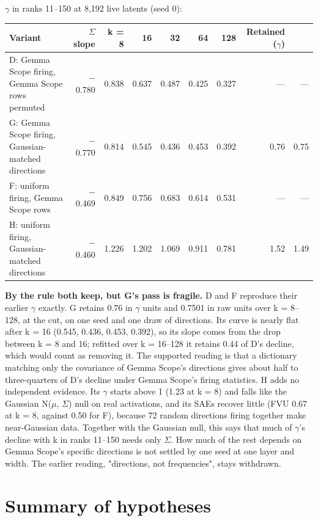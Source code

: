 \documentclass[11pt]{article}
\begin{document}
$\gamma$ in ranks 11--150 at 8,192 live latents (seed 0):

{\footnotesize\setlength{\tabcolsep}{4pt}
\begin{xltabular}{\textwidth}{>{\raggedright\arraybackslash}Xrrrrrrrr}
\toprule
\textbf{Variant} & \textbf{$\Sigma$ slope} & \textbf{k = 8} & \textbf{16} & \textbf{32} & \textbf{64} & \textbf{128} & \textbf{Retained ($\gamma$)} & \textbf{} \\
\midrule
\endhead
\bottomrule
\endlastfoot
D: Gemma Scope firing, Gemma Scope rows permuted & $-$0.780 & 0.838 & 0.637 & 0.487 & 0.425 & 0.327 & --- & --- \\
G: Gemma Scope firing, Gaussian-matched directions & $-$0.770 & 0.814 & 0.545 & 0.436 & 0.453 & 0.392 & 0.76 & 0.75 \\
F: uniform firing, Gemma Scope rows & $-$0.469 & 0.849 & 0.756 & 0.683 & 0.614 & 0.531 & --- & --- \\
H: uniform firing, Gaussian-matched directions & $-$0.460 & 1.226 & 1.202 & 1.069 & 0.911 & 0.781 & 1.52 & 1.49 \\
\end{xltabular}}

\textbf{By the rule both keep, but G's pass is fragile.} D and F reproduce their earlier $\gamma$ exactly. G retains 0.76 in $\gamma$ units and 0.7501 in raw units over k = 8--128, at the cut, on one seed and one draw of directions. Its curve is nearly flat after k = 16 (0.545, 0.436, 0.453, 0.392), so its slope comes from the drop between k = 8 and 16; refitted over k = 16--128 it retains 0.44 of D's decline, which would count as removing it. The supported reading is that a dictionary matching only the covariance of Gemma Scope's directions gives about half to three-quarters of D's decline under Gemma Scope's firing statistics. H adds no independent evidence. Its $\gamma$ starts above 1 (1.23 at k = 8) and falls like the Gaussian N($\mu$, $\Sigma$) null on real activations, and its SAEs recover little (FVU 0.67 at k = 8, against 0.50 for F), because 72 random directions firing together make near-Gaussian data. Together with the Gaussian null, this says that much of $\gamma$'s decline with k in ranks 11--150 needs only $\Sigma$. How much of the rest depends on Gemma Scope's specific directions is not settled by one seed at one layer and width. The earlier reading, "directions, not frequencies", stays withdrawn.

\section{Summary of hypotheses}
\end{document}
